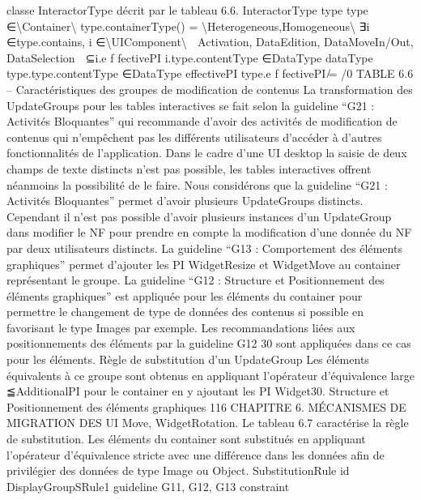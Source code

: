 \documentclass{article}
\begin{document}
classe InteractorType d\'{e}crit par le tableau 6.6.
InteractorType
type
type ∈\textbackslash{}{Container\textbackslash{}}
type.containerType() = \textbackslash{}{Heterogeneous,Homogeneous\textbackslash{}}
∃i ∈type.contains, i ∈\textbackslash{}{UIComponent\textbackslash{}}

Activation, DataEdition,
DataMoveIn/Out, DataSelection

⊆i.e f fectivePI
i.type.contentType ∈DataType
dataType
type.type.contentType ∈DataType
effectivePI
type.e f fectivePI ̸= /0
TABLE 6.6 – Caract\'{e}ristiques des groupes de modiﬁcation de contenus
La transformation des UpdateGroups pour les tables interactives se fait selon la guideline “G21 :
Activit\'{e}s Bloquantes” qui recommande d’avoir des activit\'{e}s de modiﬁcation de contenus qui n’emp\^{e}chent pas les diff\'{e}rents utilisateurs d’acc\'{e}der \`{a} d’autres fonctionnalit\'{e}s de l’application. Dans le
cadre d’une UI desktop la saisie de deux champs de texte distincts n’est pas possible, les tables interactives offrent n\'{e}anmoins la possibilit\'{e} de le faire. Nous consid\'{e}rons que la guideline “G21 : Activit\'{e}s
Bloquantes” permet d’avoir plusieurs UpdateGroups distincts. Cependant il n’est pas possible d’avoir
plusieurs instances d’un UpdateGroup dans modiﬁer le NF pour prendre en compte la modiﬁcation
d’une donn\'{e}e du NF par deux utilisateurs distincts.
La guideline “G13 : Comportement des \'{e}l\'{e}ments graphiques” permet d’ajouter les PI WidgetResize et WidgetMove au container repr\'{e}sentant le groupe.
La guideline “G12 : Structure et Positionnement des \'{e}l\'{e}ments graphiques” est appliqu\'{e}e pour les
\'{e}l\'{e}ments du container pour permettre le changement de type de donn\'{e}es des contenus si possible en
favorisant le type Images par exemple. Les recommandations li\'{e}es aux positionnements des \'{e}l\'{e}ments
par la guideline G12 30 sont appliqu\'{e}es dans ce cas pour les \'{e}l\'{e}ments.
R\`{e}gle de substitution d’un UpdateGroup
Les \'{e}l\'{e}ments \'{e}quivalents \`{a} ce groupe sont obtenus en
appliquant l’op\'{e}rateur d’\'{e}quivalence large ≦AdditionalPI pour le container en y ajoutant les PI Widget30. Structure et Positionnement des \'{e}l\'{e}ments graphiques
116
CHAPITRE 6. MÉCANISMES DE MIGRATION DES UI
Move, WidgetRotation. Le tableau 6.7 caract\'{e}rise la r\`{e}gle de substitution. Les \'{e}l\'{e}ments du container
sont substitu\'{e}s en appliquant l’op\'{e}rateur d’\'{e}quivalence stricte avec une diff\'{e}rence dans les donn\'{e}es
aﬁn de privil\'{e}gier des donn\'{e}es de type Image ou Object.
SubstitutionRule
id
DisplayGroupSRule1
guideline
G11, G12, G13
constraint
\end{document}

